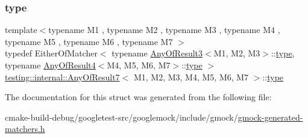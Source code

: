 \subsubsection{\texorpdfstring{type}{type}}
{\footnotesize\ttfamily template$<$typename M1 , typename M2 , typename M3 , typename M4 , typename M5 , typename M6 , typename M7 $>$ \\
typedef Either\+Of\+Matcher$<$ typename \mbox{\hyperlink{structtesting_1_1internal_1_1AnyOfResult3}{Any\+Of\+Result3}}$<$M1, M2, M3$>$\+::\mbox{\hyperlink{structtesting_1_1internal_1_1AnyOfResult7_a976873478921520833464a86f840abe8}{type}}, typename \mbox{\hyperlink{structtesting_1_1internal_1_1AnyOfResult4}{Any\+Of\+Result4}}$<$M4, M5, M6, M7$>$\+::\mbox{\hyperlink{structtesting_1_1internal_1_1AnyOfResult7_a976873478921520833464a86f840abe8}{type}} $>$ \mbox{\hyperlink{structtesting_1_1internal_1_1AnyOfResult7}{testing\+::internal\+::\+Any\+Of\+Result7}}$<$ M1, M2, M3, M4, M5, M6, M7 $>$\+::\mbox{\hyperlink{structtesting_1_1internal_1_1AnyOfResult7_a976873478921520833464a86f840abe8}{type}}}



The documentation for this struct was generated from the following file\+:\begin{DoxyCompactItemize}
\item 
cmake-\/build-\/debug/googletest-\/src/googlemock/include/gmock/\mbox{\hyperlink{gmock-generated-matchers_8h}{gmock-\/generated-\/matchers.\+h}}\end{DoxyCompactItemize}
